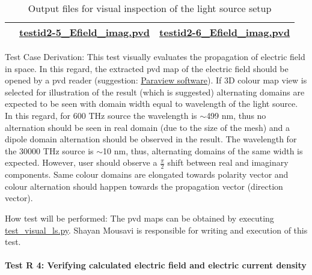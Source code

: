 \documentclass[12pt, titlepage]{article}
\begin{document}
\begin{enumerate}
\begin{itemize}
\begin{table}
\begin{tabular}{|c|c|c|}
			    &
			     \href{https://github.com/shmouses/SPDFM/tree/master/src/Test Output}{testid2-5\_Efield\_imag.pvd} & \href{https://github.com/shmouses/SPDFM/tree/master/src/Test Output}{testid2-6\_Efield\_imag.pvd}\\
			    \hline
			    
			\end{tabular}
			\caption{Output files for visual inspection of the light source setup}
			\label{test_ls_out}
		\end{table}
		
	\end{itemize}	
	Test Case Derivation: This test visually evaluates the propagation of electric field in space. In this regard, the extracted pvd map of the electric field should be opened by a pvd reader (suggestion: \href{https://www.paraview.org/}{Paraview software}). If 3D colour map view is selected for illustration of the result (which is suggested) alternating domains are expected to be seen with domain width equal to wavelength of the light source. In this regard, for 600 THz source the wavelength is $\sim$499 nm, thus no alternation should be seen in real domain (due to the size of the mesh) and a dipole domain alternation should be observed in the result. The wavelength for the 30000 THz source is $\sim$10 nm, thus, alternating domains of the same width is expected. However, user should observe a $\frac{\pi}{2}$ shift between real and imaginary components. Same colour domains are elongated towards polarity vector and colour alternation should happen towards the propagation vector (direction vector).      
	
	How test will be performed: The pvd maps can be obtained by executing \href{https://github.com/shmouses/SPDFM/tree/master/src/test_visual_ls.py}{test\_visual\_ls.py}. Shayan Mousavi is responsible for writing and execution of this test.   
	
\end{enumerate}

\newpage

\paragraph{Test R 4: Verifying calculated electric field and electric current density}
\end{document}
